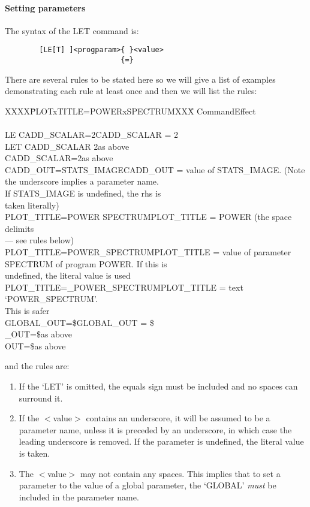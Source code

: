 \paragraph {Setting parameters}
The syntax of the LET command is:
\begin{verbatim}
        [LE[T] ]<progparam>{ }<value>
                           {=}
\end{verbatim}
There are several rules to be stated here so we will give a list of examples
demonstrating each rule at least once and then we will list the rules:
\begin{tabbing}
XXXX\=PLOTxTITLE=POWERxSPECTRUMXXX\=\kill
\>Command\>Effect\\
\\
\>LE CADD\_SCALAR=2\>CADD\_SCALAR = 2\\
\>LET CADD\_SCALAR 2\>as above\\
\>CADD\_SCALAR=2\>as above\\
\>CADD\_OUT=STATS\_IMAGE\>CADD\_OUT = value of STATS\_IMAGE. (Note\\
\>\>the underscore implies a parameter name.\\
\>\>If STATS\_IMAGE is undefined, the rhs is\\
\>\>taken literally)\\
\>PLOT\_TITLE=POWER SPECTRUM\>PLOT\_TITLE = POWER (the space delimits\\
\>\>--- see rules below)\\
\>PLOT\_TITLE=POWER\_SPECTRUM\>PLOT\_TITLE = value of parameter\\
\>\>SPECTRUM of program POWER. If this is\\
\>\>undefined, the literal value is used\\
\>PLOT\_TITLE=\_POWER\_SPECTRUM\>PLOT\_TITLE = text `POWER\_SPECTRUM'.\\
\>\>This is safer\\
\>GLOBAL\_OUT=\$\>GLOBAL\_OUT = \$\\
\>\_OUT=\$\>as above\\
\>OUT=\$\>as above
\end{tabbing}
and the rules are:
\begin{enumerate}
\item If the `LET' is omitted, the equals sign must be included and no spaces
can surround it.
\item If the $<$value$>$ contains an underscore, it will be assumed to be a
parameter name, unless it is preceded by an underscore, in which case the
leading underscore is removed.
If the parameter is undefined, the literal value is taken.
\item The $<$value$>$ may not contain any spaces.
This implies that to set a parameter to the value of a global parameter, the
`GLOBAL' {\em must} be included in the parameter name.
\end{enumerate}
